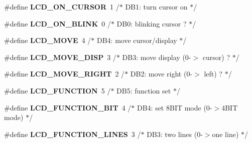 \begin{DoxyCompactItemize}
\item 
\mbox{\label{group__pfleury__lcd_ga47638b5ebbaec9600a0ebf9a55caf802}} 
\#define {\bfseries L\+C\+D\+\_\+\+O\+N\+\_\+\+C\+U\+R\+S\+OR}~1 /$\ast$   D\+B1\+: turn cursor on               $\ast$/
\item 
\mbox{\label{group__pfleury__lcd_ga5d76592a978537acee615098ce4d80f5}} 
\#define {\bfseries L\+C\+D\+\_\+\+O\+N\+\_\+\+B\+L\+I\+NK}~0 /$\ast$     D\+B0\+: blinking cursor ?          $\ast$/
\item 
\mbox{\label{group__pfleury__lcd_ga3f4f758b80fcfa6c9e4db58e2515c78a}} 
\#define {\bfseries L\+C\+D\+\_\+\+M\+O\+VE}~4 /$\ast$ D\+B4\+: move cursor/display            $\ast$/
\item 
\mbox{\label{group__pfleury__lcd_gaaddc2afa9a02bfa748950f2c1e6a204d}} 
\#define {\bfseries L\+C\+D\+\_\+\+M\+O\+V\+E\+\_\+\+D\+I\+SP}~3 /$\ast$   D\+B3\+: move display (0-\/$>$ cursor) ?  $\ast$/
\item 
\mbox{\label{group__pfleury__lcd_ga97cdb19acf109ad52ab4994d2ad02cee}} 
\#define {\bfseries L\+C\+D\+\_\+\+M\+O\+V\+E\+\_\+\+R\+I\+G\+HT}~2 /$\ast$   D\+B2\+: move right (0-\/$>$ left) ?      $\ast$/
\item 
\mbox{\label{group__pfleury__lcd_ga50de1697f1da8ab075a6b4d7aeace64e}} 
\#define {\bfseries L\+C\+D\+\_\+\+F\+U\+N\+C\+T\+I\+ON}~5 /$\ast$ D\+B5\+: function set                   $\ast$/
\item 
\mbox{\label{group__pfleury__lcd_ga91d15d8e3008f6cb141406a8b5d0d3c0}} 
\#define {\bfseries L\+C\+D\+\_\+\+F\+U\+N\+C\+T\+I\+O\+N\+\_\+B\+IT}~4 /$\ast$   D\+B4\+: set 8\+B\+I\+T mode (0-\/$>$4\+B\+I\+T mode) $\ast$/
\item 
\mbox{\label{group__pfleury__lcd_ga6c24806bed18d565917165caa3475463}} 
\#define {\bfseries L\+C\+D\+\_\+\+F\+U\+N\+C\+T\+I\+O\+N\+\_\+L\+I\+N\+ES}~3 /$\ast$   D\+B3\+: two lines (0-\/$>$one line)      $\ast$/
\item 
\mbox{\label{group__pfleury__lcd_ga48de81358277fe4f2810c2b82f90397e}} 

\end{DoxyCompactItemize}
